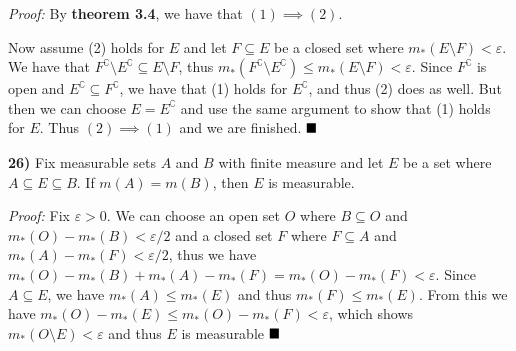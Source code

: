 \documentclass[12pt]{article}
\newcommand{\e}{\ensuremath{\varepsilon}}
\newcommand{\comp}{\complement}
\newcommand{\sdiff}{\setminus}
\newcommand{\proof}{\textit{Proof: }}
\newcommand{\done}{\ensuremath{\strut\hfill\blacksquare}}
\begin{document}
\proof
By \textbf{theorem 3.4}, we have that \( (1) \implies (2) \).

Now assume (2) holds for \( E \) and let \( F \subseteq E \) be a closed set
where \( m_*(E \setminus F) < \e \).
We have that \( F^\comp \sdiff E^\comp \subseteq E \sdiff F \), thus
\( m_*(F^\comp \sdiff E^\comp) \leq m_*(E \sdiff F) < \e \).
Since \( F^\comp \) is open and \( E^\comp \subseteq F^\comp \), we have that
(1) holds for \( E^\comp \), and thus (2) does as well.
But then we can choose \( E = E^\comp \) and use the same argument to show that
(1) holds for \( E \).
Thus \( (2) \implies (1) \) and we are finished.
\done

\pagebreak
\textbf{26)}
Fix measurable sets \( A \) and \( B \) with finite measure and let \( E \) be
a set where \( A \subseteq E \subseteq B \).
If \( m(A) = m(B) \), then \( E \) is measurable.

\proof
Fix \( \e > 0 \).
We can choose an open set \( O \) where \( B \subseteq O \) and
\( m_*(O) - m_*(B) < \e / 2 \) and a closed set \( F \) where
\( F \subseteq A \) and \( m_*(A) - m_*(F) < \e / 2 \), thus we have
\( m_*(O) - m_*(B) + m_*(A) - m_*(F) = m_*(O) - m_*(F) < \e \).
Since \( A \subseteq E \), we have \( m_*(A) \leq m_*(E) \) and thus
\( m_*(F) \leq m_*(E) \).
From this we have \( m_*(O) - m_*(E) \leq m_*(O) - m_*(F) < \e \),
which shows \( m_*(O \setminus E) < \e \) and thus \( E \) is measurable
\done


\end{document}
